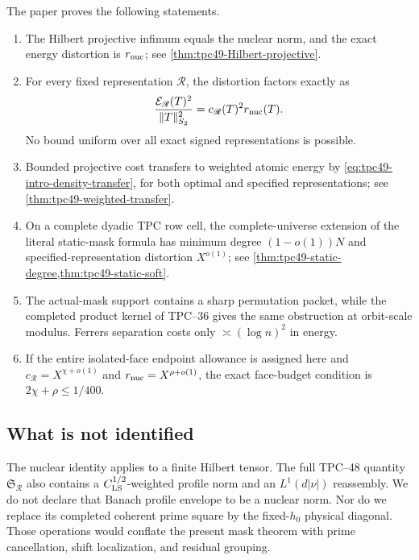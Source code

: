 The paper proves the following statements.
\begin{enumerate}[label=\textup{(\roman*)},leftmargin=2.4em]
 \item The Hilbert projective infimum equals the nuclear norm, and the
       exact energy distortion is \(r_{\rm nuc}\); see
       \cref{thm:tpc49-Hilbert-projective}.
 \item For every fixed representation \(\mathscr R\), the distortion
       factors exactly as
       \begin{equation}
       \frac{\mathcal E_{\mathscr R}(T)^2}{\|T\|_{S_2}^2}
       =c_{\mathscr R}(T)^2r_{\rm nuc}(T).
       \label{eq:tpc49-intro-exact-ledger}
       \end{equation}
       No bound uniform over all exact signed representations is
       possible.
 \item Bounded projective cost transfers to weighted atomic energy by
       \eqref{eq:tpc49-intro-density-transfer}, for both optimal and
       specified representations; see
       \cref{thm:tpc49-weighted-transfer}.
 \item On a complete dyadic TPC row cell, the complete-universe extension
       of the literal static-mask formula has minimum degree
       \((1-o(1))N\) and specified-representation
       distortion \(X^{o(1)}\); see
       \cref{thm:tpc49-static-degree,thm:tpc49-static-soft}.
 \item The actual-mask support contains a sharp permutation packet,
       while the completed product kernel of TPC--36 gives the same
       obstruction at orbit-scale modulus.  Ferrers separation costs
       only \(\asymp(\log n)^2\) in energy.
 \item If the entire isolated-face endpoint allowance is assigned here
       and
       \(c_{\mathscr R}=X^{\chi+o(1)}\) and
       \(r_{\rm nuc}=X^{\rho+o(1)}\), the exact face-budget condition is
       \(2\chi+\rho\le1/400\).
\end{enumerate}

\subsection{What is not identified}

The nuclear identity applies to a finite Hilbert tensor.  The full
TPC--48 quantity \(\mathfrak S_{\mathscr R}\) also contains a
\(C_{\rm LS}^{1/2}\)-weighted profile norm and an \(L^1(d|\nu|)\)
reassembly.  We do not declare that Banach profile envelope to be a
nuclear norm.  Nor do we replace its completed coherent prime square by
the fixed-\(h_0\) physical diagonal.  Those operations would conflate
the present mask theorem with prime cancellation, shift localization,
and residual grouping.

